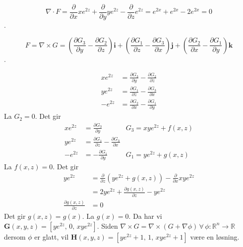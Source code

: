 \documentclass[11pt, a4paper, norsk]{NTNUoving}
\newcommand{\R}{\mathbb{R}}
\begin{document}
\begin{oppgave}
    $$\nabla \cdot F = \frac{\partial}{\partial x}xe^{2z}+\frac{\partial}{\partial y}ye^{2z}-\frac{\partial}{\partial z}e^{2z} = e^{2x}+e^{2x}-2e^{2x}=0$$.
    
    $$F = \nabla \times G = \left(\frac{\partial G_3}{\partial y} - \frac{\partial G_2}{\partial z}\right)\textbf{i}+ \left(\frac{\partial G_1}{\partial z} - \frac{\partial G_3}{\partial x}\right)\textbf{j} + \left(\frac{\partial G_2}{\partial x} - \frac{\partial G_1}{\partial y}\right)\textbf{k}$$.

    \begin{align*}
        xe^{2z} &= \frac{\partial G_3}{\partial y} - \frac{\partial G_2}{\partial z}\\
        ye^{2z} &= \frac{\partial G_1}{\partial z} - \frac{\partial G_3}{\partial x}\\
        -e^{2z} &= \frac{\partial G_2}{\partial x} - \frac{\partial G_1}{\partial y}
    \end{align*}
    La $G_2=0$. Det gir 
    \begin{align*}
        xe^{2z} &= \frac{\partial G_3}{\partial y} &G_3=xye^{2z} + f(x, z)\\
        ye^{2z} &= \frac{\partial G_1}{\partial z} - \frac{\partial G_3}{\partial x}\\
        -e^{2z} &=   -\frac{\partial G_1}{\partial y} &G_1=ye^{2z}+g(x, z)
    \end{align*}
    La $f(x,z)=0$. Det gir
    \begin{align*}
            ye^{2z} &= \frac{\partial}{\partial z}\left(ye^{2z}+g(x, z)\right) - \frac{\partial}{\partial x}xye^{2z}\\
            &= 2ye^{2z}+\frac{\partial g(x, z)}{\partial z} -ye^{2z}\\
            \frac{\partial g(x, z)}{\partial z} &= 0
    \end{align*}
    Det gir $g(x, z)=g(x)$. La $g(x)=0$. Da har vi $\textbf{G}(x, y, z)=\left[ye^{2z},\, 0,\,  xye^{2z}\right]$. Siden $\nabla \times G = \nabla \times (G+\nabla\phi)\,\forall\,\phi: \R^n \rightarrow \R$ dersom $\phi$ er glatt, vil $\textbf{H}(x, y, z)=\left[ye^{2z}+1,\, 1,\,  xye^{2z}+1\right]$ være en løsning.
    
\end{oppgave}
\end{document}
